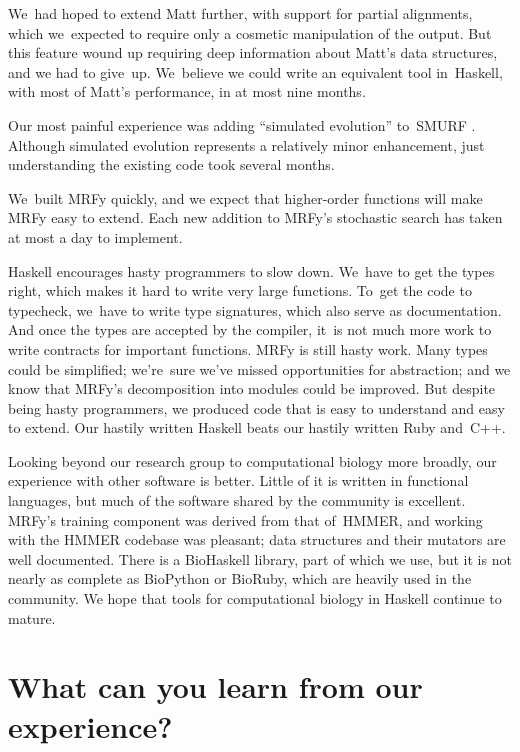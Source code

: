 \documentclass[]{jfp1}
\let\cite\citep
\begin{document}
We~had hoped to extend Matt further, with support for partial alignments,
which we~expected to require only 
a cosmetic manipulation of the 
output.
But
this feature wound up
requiring deep information about Matt's data structures,
and we had to give~up.
We~believe we could write an equivalent tool in~Haskell,
with most of Matt's performance, in at most nine months.

Our most painful experience was adding ``simulated evolution''
to~SMURF \cite{Daniels:2012}. 
Although simulated evolution represents a relatively minor
enhancement,
just understanding the existing code took several months.

We~built MRFy quickly, and we expect that
higher-order functions will make MRFy easy to extend.
Each new addition to MRFy's stochastic search has taken at most a day
to implement.

Haskell encourages hasty programmers to slow down.
We~have to get the types right,
which makes it hard to write very large functions.
To~get the code to typecheck, we~have to write type signatures, which
also serve as documentation.
And once the types are accepted by the compiler,
it~is not much more work to write contracts for important functions.
MRFy is still hasty work.
Many types could be simplified;
we're~sure we've missed opportunities for abstraction;
and we know that MRFy's decomposition into modules could be improved.
But despite being hasty programmers, we produced code 
that is easy to understand and easy to extend.
Our hastily written Haskell beats
our hastily written Ruby and~C++.
{\ifpagetuning{} \par\fi}


Looking beyond our research group to computational biology more
broadly, our experience with other software is better.
Little of it is written in functional languages, 
but much of the software shared by the community is excellent.
MRFy's training component was derived from that of~HMMER,
and
working with the HMMER 
codebase was pleasant;
data structures and their
mutators are well documented. 
There is a 
BioHaskell library, part of which we use,
but it is not nearly as 
complete as BioPython or BioRuby, which are heavily used in the community.
We hope that tools for computational biology in
Haskell continue to mature. 

\section{What can you learn from our experience?}
\end{document}
